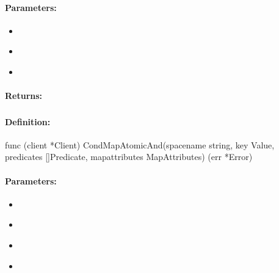 \paragraph{Parameters:}
\begin{itemize}[noitemsep]
\item {}\\

\item {}\\

\item {}\\

\end{itemize}

\paragraph{Returns:}


\pagebreak
\subsubsection{}
\label{api:Go:CondMapAtomicAnd}


\paragraph{Definition:}
\begin{gocode}
func (client *Client) CondMapAtomicAnd(spacename string, key Value, predicates []Predicate, mapattributes MapAttributes) (err *Error)
\end{gocode}

\paragraph{Parameters:}
\begin{itemize}[noitemsep]
\item {}\\

\item {}\\

\item {}\\

\item {}\\

\end{itemize}

